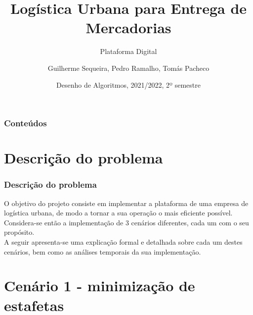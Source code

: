 \documentclass{beamer}
\title[Plataforma Digital]
{Logística Urbana para Entrega de Mercadorias}
\subtitle{Plataforma Digital}
\author[Grupo 30, 2LEIC03]
{Guilherme Sequeira, Pedro Ramalho, Tomás Pacheco}
\institute[FEUP]
{
  Faculdade de Engenheria\\
  Universidade do Porto
}
\date[2021/2022 2S]
{Desenho de Algoritmos, 2021/2022, 2º semestre}
\begin{document}

\frame{\titlepage}



\begin{frame}
  \frametitle{Conteúdos}
  \tableofcontents
\end{frame}






\section{Descrição do problema}


\begin{frame}[fragile]
\frametitle{Descrição do problema}
O objetivo do projeto consiste em implementar a plataforma de uma empresa
de logística urbana, de modo a tornar a sua operação o mais eficiente possível.
Considera-se então a implementação de 3 cenários diferentes, cada um com o seu propósito.\\

A seguir apresenta-se uma explicação formal e detalhada sobre cada um destes cenários, bem como
as análises temporais da sua implementação.
\end{frame}








\section{Cenário 1 - minimização de estafetas}
\end{document}
